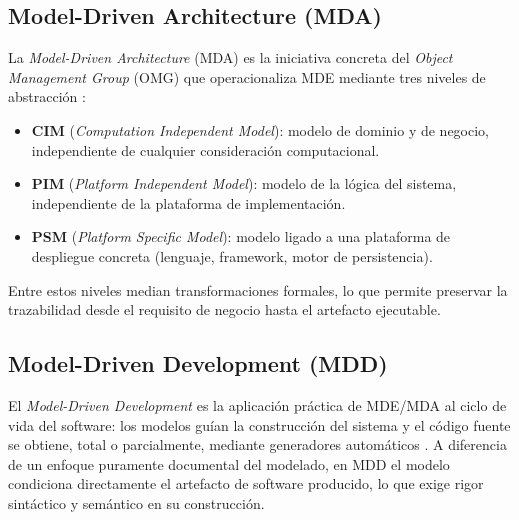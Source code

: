 \documentclass[11pt,a4paper]{article}
\begin{document}
\subsection{Model-Driven Architecture (MDA)}
La \textit{Model-Driven Architecture} (MDA) es la iniciativa concreta del \textit{Object Management
Group} (OMG) que operacionaliza MDE mediante tres niveles de abstracción \cite{omg2014mda}:
\begin{itemize}[nosep]
  \item \textbf{CIM} (\textit{Computation Independent Model}): modelo de dominio y de negocio,
        independiente de cualquier consideración computacional.
  \item \textbf{PIM} (\textit{Platform Independent Model}): modelo de la lógica del sistema,
        independiente de la plataforma de implementación.
  \item \textbf{PSM} (\textit{Platform Specific Model}): modelo ligado a una plataforma de despliegue
        concreta (lenguaje, framework, motor de persistencia).
\end{itemize}
Entre estos niveles median transformaciones formales, lo que permite preservar la trazabilidad desde
el requisito de negocio hasta el artefacto ejecutable.

\subsection{Model-Driven Development (MDD)}
El \textit{Model-Driven Development} es la aplicación práctica de MDE/MDA al ciclo de vida del
software: los modelos guían la construcción del sistema y el código fuente se obtiene, total o
parcialmente, mediante generadores automáticos \cite{selic2003,brambilla2017}. A diferencia de un
enfoque puramente documental del modelado, en MDD el modelo condiciona directamente el
artefacto de software producido, lo que exige rigor sintáctico y semántico en su construcción.
\end{document}
